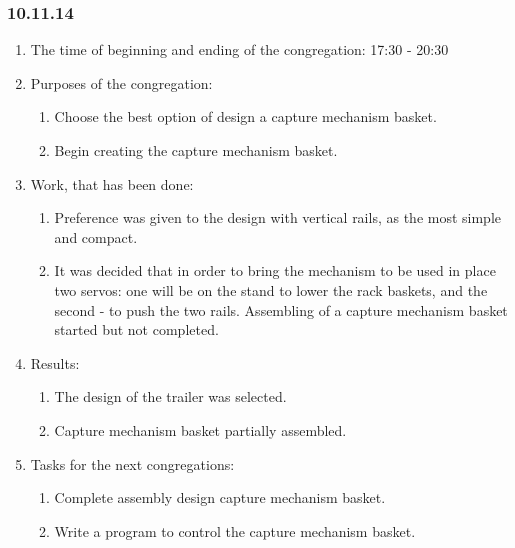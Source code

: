 
\subsubsection{10.11.14}

\begin{enumerate} 
	\item The time of beginning and ending of the congregation:
	17:30 - 20:30
	\item Purposes of the congregation:
	\begin{enumerate}
		\item Choose the best option of design a capture mechanism basket.
		
		\item Begin creating the capture mechanism basket.
		
	\end{enumerate}
	
	\item Work, that has been done:
	\begin{enumerate}
		\item Preference was given to the design with vertical rails, as the most simple and compact.
		
		\item It was decided that in order to bring the mechanism to be used in place two servos: one will be on the stand to lower the rack baskets, and the second - to push the two rails. Assembling of a capture mechanism basket started but not completed.
		
		
	\end{enumerate}
	
	\item Results:  
	\begin{enumerate}
		\item The design of the trailer was selected.
		
		\item Capture mechanism basket partially assembled.
		
	\end{enumerate}
	
	\item Tasks for the next congregations:
	\begin{enumerate}
		\item Complete assembly design capture mechanism basket.
		
		\item Write a program to control the capture mechanism basket.
		
	\end{enumerate}     
\end{enumerate}
\fillpage

